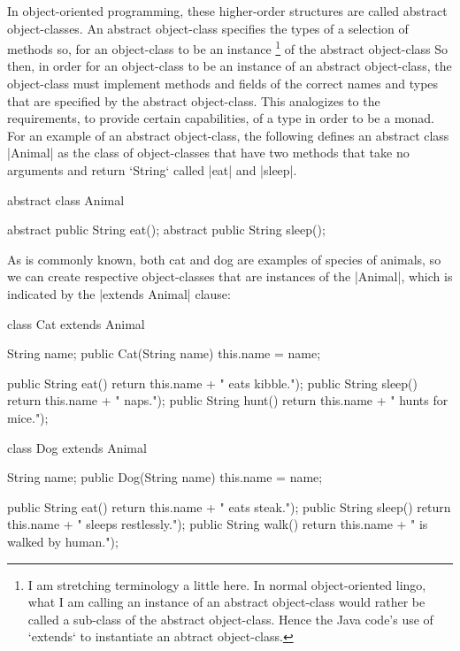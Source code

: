 In object-oriented programming, these higher-order structures are called abstract object-classes.
An abstract object-class specifies the types of a selection of methods so,
for an object-class to be an instance%
\footnote{
  I am stretching terminology a little here.
  In normal object-oriented lingo, what I am calling an instance of an abstract object-class would rather be called a sub-class of the abstract object-class.
  Hence the Java code's use of \code`extends` to instantiate an abtract object-class.
}
of the abstract object-class
So then, in order for an object-class to be an instance of an abstract object-class, the object-class must implement methods and fields of the correct names and types that are specified by the abstract object-class.
This analogizes to the requirements, to provide certain capabilities, of a type in order to be a monad.
For an example of an abstract object-class, the following defines an abstract class \code|Animal| as the class of object-classes that have two methods that take no arguments and return \code`String` called \code|eat| and \code|sleep|.
%
\newpage
\begin{snippet-Java}
abstract class Animal {

  abstract public String eat();
  abstract public String sleep();

}
\end{snippet-Java}
As is commonly known, both cat and dog are examples of species of animals, so we can create respective object-classes that are instances of the {\code|Animal|,} which is indicated by the \code|extends Animal| clause:
\newpage
\begin{snippet-Java}
class Cat extends Animal {

  String name;
  public Cat(String name) { this.name = name; }

  public String eat()   { return this.name + " eats kibble."); }
  public String sleep() { return this.name + " naps."); }
  public String hunt()  { return this.name + " hunts for mice."); }

}
\end{snippet-Java}
\begin{snippet-Java}
class Dog extends Animal {

  String name;
  public Dog(String name) { this.name = name; }

  public String eat()   { return this.name + " eats steak."); }
  public String sleep() { return this.name + " sleeps restlessly."); }
  public String walk()  { return this.name + " is walked by human."); }

}
\end{snippet-Java}

